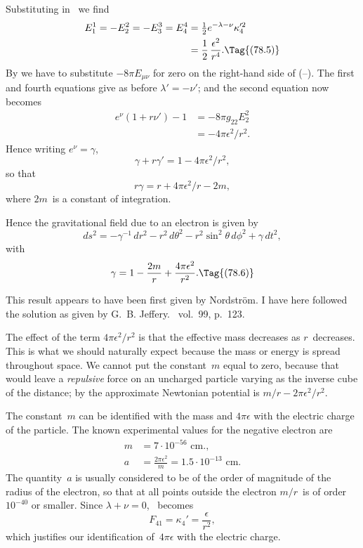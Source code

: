 \documentclass[12pt]{book}
\begin{document}
Substituting in~ we find
\begin{align*}
  E_{1}^{1}
  = -E_{2}^{2}
  = -E_{3}^{3}
  = E_{4}^{4}
  &= \tfrac{1}{2} e^{-\lambda-\nu} \kappa_{4}'^{2} \\
  &= \frac{1}{2}\, \frac{\epsilon^{2}}{r^{4}}.
  \Tag{(78.5)}
\end{align*}
By  we have to substitute $-8\pi E_{\mu\nu}$ for zero on the right-hand side of
(--). The first and fourth equations give as before $\lambda' = -\nu'$; and the
second equation now becomes
\begin{align*}
  e^{\nu} (1 + r\nu') - 1
  &= -8\pi g_{22} E_{2}^{2} \\
  &= -4\pi \epsilon^{2}/r^{2}.
\end{align*}
Hence writing $e^{\nu} = \gamma$,
\[
\gamma + r\gamma' = 1 - 4\pi \epsilon^{2}/r^{2},
\]
so that
\[
r\gamma = r + 4\pi \epsilon^{2}/r - 2m,
\]
where $2m$~is a constant of integration.

Hence the gravitational field due to an electron is given by
\[
ds^{2} = -\gamma^{-1}\, dr^{2} - r^{2}\, d\theta^{2} - r^{2}\sin^{2}\theta\, d\phi^{2} + \gamma\, dt^{2},
\]
with
\[
\gamma = 1 - \frac{2m}{r} + \frac{4\pi\epsilon^{2}}{r^{2}}.
\Tag{(78.6)}
\]

This result appears to have been first given by Nordström. I have here
followed the solution as given by G.~B. Jeffery\footnotemark.\footnotetext
  {\ vol.~99, p.~123.}

The effect of the term $4\pi\epsilon^{2}/r^{2}$ is that the effective mass decreases as $r$~decreases.
This is what we should naturally expect because the mass or energy
is spread throughout space. We cannot put the constant~$m$ equal to zero,
because that would leave a \emph{repulsive} force on an uncharged particle varying
as the inverse cube of the distance; by  the approximate Newtonian
potential is $m/r - 2\pi\epsilon^{2}/r^{2}$.

The constant~$m$ can be identified with the mass and $4\pi\epsilon$ with the electric
charge of the particle. The known experimental values for the negative
electron are
\begin{align*}
m &= 7 \cdot 10^{-56} \text{ cm.}, \\
a &= \frac{2\pi\epsilon^{2}}{m} = 1.5 \cdot 10^{-13} \text{ cm.}
\end{align*}
The quantity~$a$ is usually considered to be of the order of magnitude of the
radius of the electron, so that at all points outside the electron $m/r$~is of order
$10^{-40}$ or smaller. Since $\lambda + \nu = 0$, ~becomes
\[
F_{41} = \kappa_{4}' = \frac{\epsilon}{r^{2}},
\]
which justifies our identification of~$4\pi\epsilon$ with the electric charge.
\end{document}
